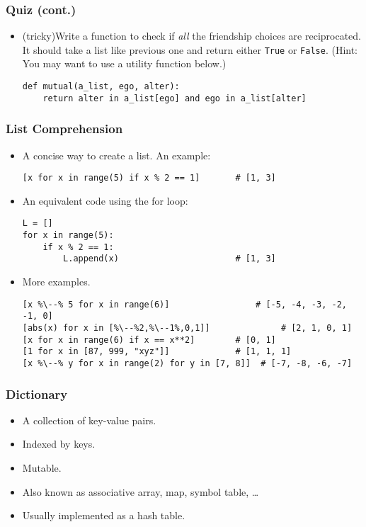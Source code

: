 \documentclass{beamer}
\begin{document}
\begin{frame}[fragile]
\frametitle{Quiz (cont.)}
\begin{itemize}
\item (tricky)Write a function to check
      if \emph{all} the friendship choices are
      reciprocated. It should take a 
      list like previous one and return either 
      \lstinline{True} or \lstinline{False}.
      (Hint: You may want to use a utility
       function below.)
\begin{lstlisting}
def mutual(a_list, ego, alter):
    return alter in a_list[ego] and ego in a_list[alter]
\end{lstlisting}
\end{itemize}
\end{frame}
 
\begin{frame}[fragile]
\frametitle{List Comprehension}
\begin{itemize}
\item A concise way to create a list. An example:
\begin{lstlisting}
[x for x in range(5) if x % 2 == 1]       # [1, 3]
\end{lstlisting}
\item An equivalent code using the for loop:
\begin{lstlisting}
L = []
for x in range(5):
    if x % 2 == 1:
        L.append(x)                       # [1, 3]
\end{lstlisting}
\item More examples.
\begin{lstlisting}[escapechar=\%]
[x %\--% 5 for x in range(6)]                 # [-5, -4, -3, -2, -1, 0]
[abs(x) for x in [%\--%2,%\--1%,0,1]]              # [2, 1, 0, 1]
[x for x in range(6) if x == x**2]        # [0, 1]
[1 for x in [87, 999, "xyz"]]             # [1, 1, 1]
[x %\--% y for x in range(2) for y in [7, 8]]  # [-7, -8, -6, -7]
\end{lstlisting}
\end{itemize}
\end{frame}
 
\begin{frame}[fragile]
\frametitle{Dictionary}
\begin{itemize}
\item<1-> A collection of key-value pairs.
\item<1-> Indexed by keys.
\item<1-> Mutable.
\item<2-> Also known as associative array, map,
      symbol table, \ldots
\item<2-> Usually implemented as a hash table.
\end{itemize}
\end{frame}
 
\end{document}
